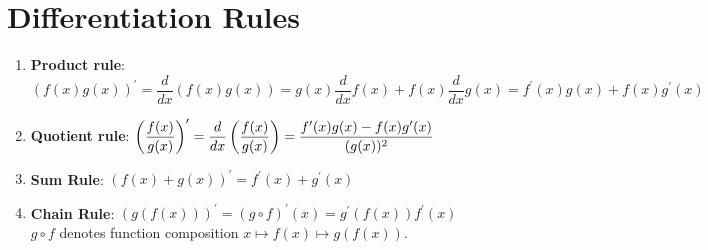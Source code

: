 \section{Differentiation Rules}

\begin{enumerate}
    \item \textbf{Product rule}: 
    $
        (f(x)g(x))^\prime
        = \dfrac{d}{dx}(f(x)g(x))
        = g(x)\dfrac{d}{dx}f(x) + f(x)\dfrac{d}{dx}g(x)
        = f^\prime(x)g(x) + f(x)g^\prime(x)
    $
    \hfill \cite{mfml/book/mml/Deisenroth-Faisal-Ong}

    \item \textbf{Quotient rule}:
    $
        \left(\dfrac{f(x)}{g(x)}\right)^\prime
        = \dfrac{d}{dx}\left(\dfrac{f(x)}{g(x)}\right)
        = \dfrac{f^\prime(x)g(x) - f(x)g^\prime(x)}{(g(x))^2}
    $
    \hfill \cite{mfml/book/mml/Deisenroth-Faisal-Ong}

    \item \textbf{Sum Rule}:
    $
        (f(x) + g(x))^\prime
        = f^\prime(x) + g^\prime(x)
    $
    \hfill \cite{mfml/book/mml/Deisenroth-Faisal-Ong}

    \item \textbf{Chain Rule}: 
    $
        (g(f(x)))^\prime
        = (g \circ f)^\prime(x)
        = g^\prime(f(x)) f^\prime(x)
    $
    \hfill \cite{mfml/book/mml/Deisenroth-Faisal-Ong}
    \\
    $g \circ f$ denotes function composition $x \mapsto f (x) \mapsto g(f (x))$.
    \hfill \cite{mfml/book/mml/Deisenroth-Faisal-Ong}
\end{enumerate}




























